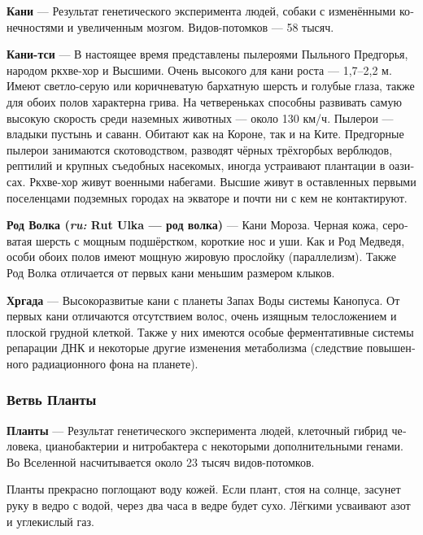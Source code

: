 \documentclass[a4paper,12pt,fleqn]{book}\usepackage{cooltooltips}\usepackage{polyglossia}\setdefaultlanguage[babelshorthands=true]{russian}\setotherlanguage{english}\defaultfontfeatures{Ligatures=TeX,Mapping=tex-text} \usepackage{xcolor}\definecolor{lightgray}{HTML}{bbbbbb}\color{lightgray}\newcommand{\ml}[3]{\textenglish{\textcolor{black}{#3}}}
\newcommand{\asterism}{\vspace{1em}{\centering\Large\bfseries$\ast~\ast~\ast$\par}\vspace{1em}}
\newcommand{\theterm}[3]{\textbf{\hypertarget{#1}{#2}} --- #3}
\newcommand{\theorigin}[3]{\textit{#1:} #2 --- #3}
\begin{document}
\theterm{kani-fork}
{Кани}
{Результат генетического эксперимента людей, собаки с изменёнными конечностями и увеличенным мозгом.
Видов-потомков --- 58 тысяч.}

\asterism

\theterm{qi-kani}
{Кани-тси}
{В настоящее время представлены пылероями Пыльного Предгорья, народом ркхве-хор и Высшими.
Очень высокого для кани роста --- 1,7--2,2 м.
Имеют светло-серую или коричневатую бархатную шерсть и голубые глаза, также для обоих полов характерна грива.
На четвереньках способны развивать самую высокую скорость среди наземных животных --- около 130 км/ч.
Пылерои --- владыки пустынь и саванн.
Обитают как на Короне, так и на Ките.
Предгорные пылерои занимаются скотоводством, разводят чёрных трёхгорбых верблюдов, рептилий и крупных съедобных насекомых, иногда устраивают плантации в оазисах.
Ркхве-хор живут военными набегами.
Высшие живут в оставленных первыми поселенцами подземных городах на экваторе и почти ни с кем не контактируют.}

\theterm{rut-ulka}
{Род Волка (\theorigin{ru}{Rut Ulka}{род волка})}
{Кани Мороза.
Черная кожа, сероватая шерсть с мощным подшёрстком, короткие нос и уши.
Как и Род Медведя, особи обоих полов имеют мощную жировую прослойку (параллелизм).
Также Род Волка отличается от первых кани меньшим размером клыков.}

\theterm{hrgadah}
{Хргада}
{Высокоразвитые кани с планеты Запах Воды системы Канопуса.
От первых кани отличаются отсутствием волос, очень изящным телосложением и плоской грудной клеткой.
Также у них имеются особые ферментативные системы репарации ДНК и некоторые другие изменения метаболизма (следствие повышенного радиационного фона на планете).}

\subsubsection{Ветвь Планты}

\theterm{plant-fork}
{Планты}
{Результат генетического эксперимента людей, клеточный гибрид человека, цианобактерии и нитробактера с некоторыми дополнительными генами.
Во Вселенной насчитывается около 23 тысяч видов-потомков.

Планты прекрасно поглощают воду кожей.
Если плант, стоя на солнце, засунет руку в ведро с водой, через два часа в ведре будет сухо.
Лёгкими усваивают азот и углекислый газ.}

\asterism
\end{document}
